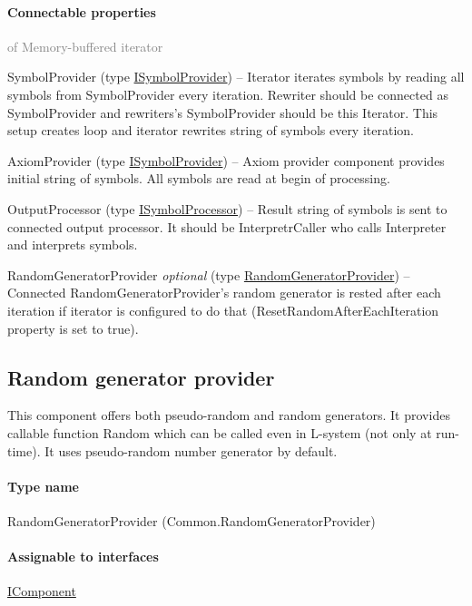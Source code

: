 	\paragraph{Connectable properties}\textcolor{gray}{of Memory-buffered iterator}
	\begin{description*}
		\item[SymbolProvider]
		(type \hyperref[Malsys.Processing.Components.ISymbolProvider]{ISymbolProvider})
			-- Iterator iterates symbols by reading all symbols from SymbolProvider every iteration.
            Rewriter should be connected as SymbolProvider and rewriters's SymbolProvider should be this Iterator.
            This setup creates loop and iterator rewrites string of symbols every iteration.
		\item[AxiomProvider]
		(type \hyperref[Malsys.Processing.Components.ISymbolProvider]{ISymbolProvider})
			-- Axiom provider component provides initial string of symbols.
            All symbols are read at begin of processing.
		\item[OutputProcessor]
		(type \hyperref[Malsys.Processing.Components.ISymbolProcessor]{ISymbolProcessor})
			-- Result string of symbols is sent to connected output processor.
            It should be InterpretrCaller who calls Interpreter and interprets symbols.
		\item[RandomGeneratorProvider]
 \textit{optional} 		(type \hyperref[Malsys.Processing.Components.Common.RandomGeneratorProvider]{RandomGeneratorProvider})
			-- Connected RandomGeneratorProvider's random generator is rested after each iteration
            if iterator is configured to do that (ResetRandomAfterEachIteration property is set to true).
	\end{description*}
	

\subsection{Random generator provider}
\label{Malsys.Processing.Components.Common.RandomGeneratorProvider}
This component offers both pseudo-random and random generators.
            It provides callable function Random which can be called even in
            L-system (not only at run-time).
            It uses pseudo-random number generator by default.\paragraph{Type name}
RandomGeneratorProvider (Common.RandomGeneratorProvider) 	\paragraph{Assignable to interfaces}
		\hyperref[Malsys.Processing.Components.IComponent]{IComponent}%
